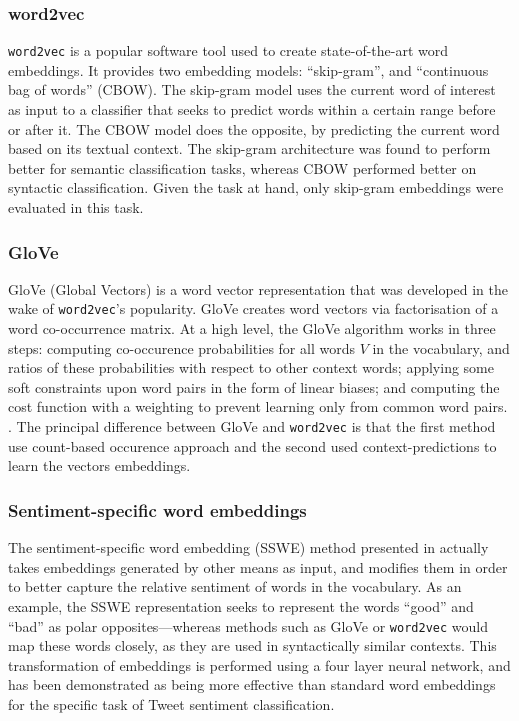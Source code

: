 \subsubsection{word2vec}
\texttt{word2vec} is a popular software tool used to create state-of-the-art word embeddings. \cite{mikolov2013distributed} It provides two embedding models: ``skip-gram'', and ``continuous bag of words'' (CBOW). The skip-gram model uses the current word of interest as input to a classifier that seeks to predict words within a certain range before or after it. The CBOW model does the opposite, by predicting the current word based on its textual context. The skip-gram architecture was found to perform better for semantic classification tasks, whereas CBOW performed better on syntactic classification. \cite{mikolov2013efficient} Given the task at hand, only skip-gram embeddings were evaluated in this task.

\subsubsection{GloVe}
GloVe (Global Vectors) is a word vector representation that was developed in the wake of \texttt{word2vec}'s popularity. GloVe creates word vectors via factorisation of a word co-occurrence matrix. At a high level, the GloVe algorithm works in three steps: computing co-occurence probabilities for all words $V$ in the vocabulary, and ratios of these probabilities with respect to other context words; applying some soft constraints upon word pairs in the form of linear biases; and computing the cost function with a weighting to prevent learning only from common word pairs. \cite{pennington2014glove}. The principal difference between GloVe and \texttt{word2vec} is that the first method use count-based occurence approach and the second used context-predictions to learn the vectors embeddings. 

\subsubsection{Sentiment-specific word embeddings}
The sentiment-specific word embedding (SSWE) method presented in \cite{tang2014learning} actually takes embeddings generated by other means as input, and modifies them in order to better capture the relative sentiment of words in the vocabulary. As an example, the SSWE representation seeks to represent the words ``good'' and ``bad'' as polar opposites---whereas methods such as GloVe or \texttt{word2vec} would map these words closely, as they are used in syntactically similar contexts. This transformation of embeddings is performed using a four layer neural network, and has been demonstrated as being more effective than standard word embeddings for the specific task of Tweet sentiment classification. \cite{tang2014learning}

